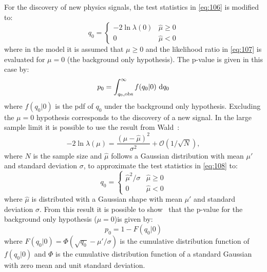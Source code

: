 For the discovery of new physics signals, the test statistics in \cref{eq:106} is
modified to:
\begin{equation}
  \label{eq:108}
  q_0 =
  \left\{
    \begin{array}{lr}
      - 2 \ln \lambda(0)  & \hat{\mu} \geq 0 \\
      0 & \hat{\mu} < 0
    \end{array}
    \right.
\end{equation}
where in the model it is assumed that $\mu \geq 0$ and the likelihood ratio in
\cref{eq:107} is evaluated for $\mu = 0$ (the background only hypothesis). The
p-value is given in this case by:
\begin{equation}
  \label{eq:109}
  p_0 = \int_{q_0, \mathrm{obs}}^\infty f(q_0 | 0)~\mathrm{d} q_0
\end{equation}
where $f(q_0 | 0)$ is the \gls{pdf} of $q_0$ under the background only
hypothesis. Excluding the $\mu = 0$ hypothesis corresponds to the discovery of a
new signal. In the large sample limit it is possible to use the result from
Wald~\cite{WaldApproximation}:
\begin{equation}
  \label{eq:110}
  - 2 \ln \lambda(\mu) = \frac{(\mu - \hat{\mu})^2}{\sigma^2} + \mathcal{O}(1/\sqrt{N}),
\end{equation}
where $N$ is the sample size and $\hat{\mu}$ follows a Gaussian distribution
with mean $\mu'$ and standard deviation $\sigma$, to approximate the test
statistics in \cref{eq:108} to:
\begin{equation}
  \label{eq:111}
  q_0 = \left\{
    \begin{array}{lr}
      \hat{\mu}^2/\sigma & \hat{\mu} \geq 0 \\
      0 & \hat{\mu} < 0
    \end{array}
    \right.
\end{equation}
where $\hat{\mu}$ is distributed with a Gaussian shape with mean $\mu'$ and
standard deviation $\sigma$. From this result it is possible to
show~\cite{StatProcedure} that the p-value for the background only hypothesis
($\mu = 0$)is given by:
\begin{equation}
  \label{eq:112}
  p_0 = 1 - F(q_0|0)
\end{equation}
where $F(q_0|0) = \Phi \left( \sqrt{q_0} - \mu' / \sigma \right)$ is the
cumulative distribution function of $f(q_0|0)$ and $\Phi$ is the cumulative
distribution function of a standard Gaussian with zero mean and unit standard
deviation.

